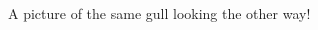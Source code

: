 \documentclass[oneside, 11pt, a4paper]{article}
\begin{document}
\begin{multicols}{2}
 \begin{figure}[H]
  \begin{center}
  \caption{A picture of the same gull
           looking the other way!}
  \end{center}
  
\end{figure}



%
%
%
%
%
%
%





{}




\end{multicols}
\end{document}
